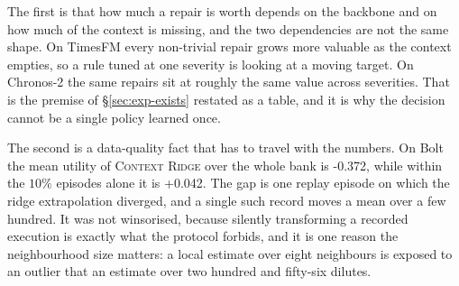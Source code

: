 \documentclass{article}
\begin{document}
The first is that how much a repair is worth depends on the backbone and on how much of the
context is missing, and the two dependencies are not the same shape. On TimesFM every
non-trivial repair grows more valuable as the context empties, so a rule tuned at one severity
is looking at a moving target. On Chronos-2 the same repairs sit at roughly the same value
across severities. That is the premise of \S\ref{sec:exp-exists} restated as a table, and it is
why the decision cannot be a single policy learned once.

The second is a data-quality fact that has to travel with the numbers. On Bolt the mean utility
of \textsc{Context Ridge} over the whole bank is -0.372, while within the $10\%$
episodes alone it is +0.042. The gap is one replay episode on which the ridge
extrapolation diverged, and a single such record moves a mean over a few hundred. It was not
winsorised, because silently transforming a recorded execution is exactly what the protocol
forbids, and it is one reason the neighbourhood size matters: a local estimate over eight
neighbours is exposed to an outlier that an estimate over two hundred and fifty-six dilutes.
\end{document}
